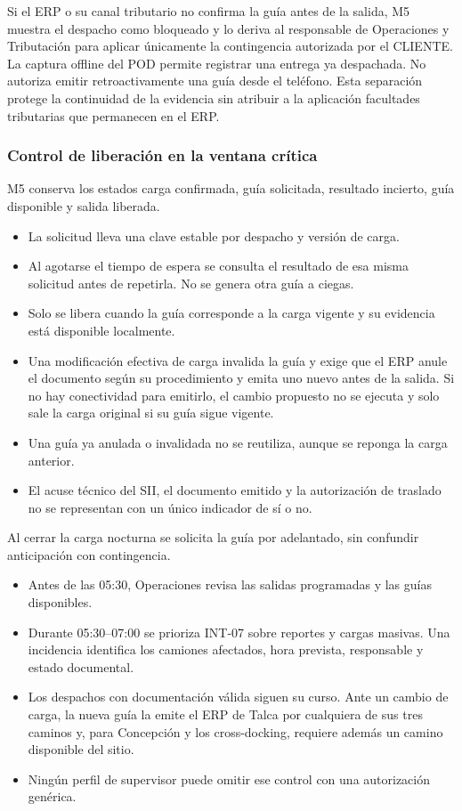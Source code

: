Si el ERP o su canal tributario no confirma la guía antes de la salida, M5 muestra el despacho como bloqueado y lo deriva al responsable de Operaciones y Tributación para aplicar únicamente la contingencia autorizada por el CLIENTE. La captura offline del POD permite registrar una entrega ya despachada. No autoriza emitir retroactivamente una guía desde el teléfono. Esta separación protege la continuidad de la evidencia sin atribuir a la aplicación facultades tributarias que permanecen en el ERP.

\subsubsection{Control de liberación en la ventana crítica}

M5 conserva los estados carga confirmada, guía solicitada, resultado incierto, guía disponible y salida liberada.

\begin{itemize}
  \item La solicitud lleva una clave estable por despacho y versión de carga.
  \item Al agotarse el tiempo de espera se consulta el resultado de esa misma solicitud antes de repetirla. No se genera otra guía a ciegas.
  \item Solo se libera cuando la guía corresponde a la carga vigente y su evidencia está disponible localmente.
  \item Una modificación efectiva de carga invalida la guía y exige que el ERP anule el documento según su procedimiento y emita uno nuevo antes de la salida. Si no hay conectividad para emitirlo, el cambio propuesto no se ejecuta y solo sale la carga original si su guía sigue vigente.
  \item Una guía ya anulada o invalidada no se reutiliza, aunque se reponga la carga anterior.
  \item El acuse técnico del SII, el documento emitido y la autorización de traslado no se representan con un único indicador de sí o no.
\end{itemize}

Al cerrar la carga nocturna se solicita la guía por adelantado, sin confundir anticipación con contingencia.

\begin{itemize}
  \item Antes de las 05:30, Operaciones revisa las salidas programadas y las guías disponibles.
  \item Durante 05:30--07:00 se prioriza INT-07 sobre reportes y cargas masivas. Una incidencia identifica los camiones afectados, hora prevista, responsable y estado documental.
  \item Los despachos con documentación válida siguen su curso. Ante un cambio de carga, la nueva guía la emite el ERP de Talca por cualquiera de sus tres caminos y, para Concepción y los cross-docking, requiere además un camino disponible del sitio.
  \item Ningún perfil de supervisor puede omitir ese control con una autorización genérica.
\end{itemize}


